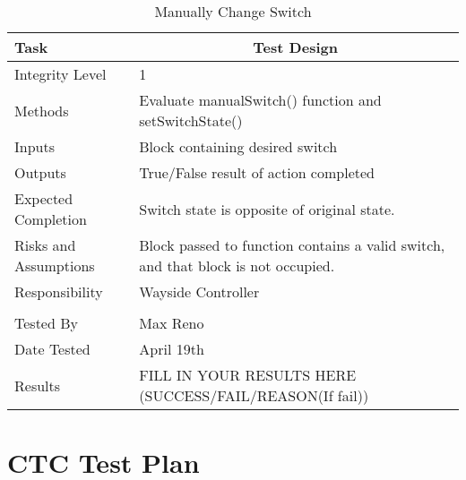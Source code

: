 \documentclass[]{article}
\begin{document}
	\begin{table}[H]
		\centering
		\caption{Manually Change Switch}
		\begin{tabular}{|l|l|}
			\hline
			Task & \multicolumn{1}{c|}{Test Design} \\ \hline
			Integrity Level & 1 \\ \hline
			Methods & Evaluate manualSwitch() function and setSwitchState()\\ \hline
			Inputs &  Block containing desired switch\\ \hline
			Outputs &  True/False result of action completed\\ \hline
			Expected Completion & Switch state is opposite of original state. \\ \hline
			Risks and Assumptions & \parbox[t]{10cm}{Block passed to function contains a valid switch, and that block is not occupied.} \\ \hline
			Responsibility & Wayside Controller\\ \hline
			\\ \hline
			Tested By   &  Max Reno\\	\hline
			Date Tested & \parbox[t]{10cm}{April 19th}\\ \hline
			Results & FILL IN YOUR RESULTS HERE (SUCCESS/FAIL/REASON(If fail))\\ \hline
		\end{tabular}
	\end{table}

\section{CTC Test Plan}
\end{document}
